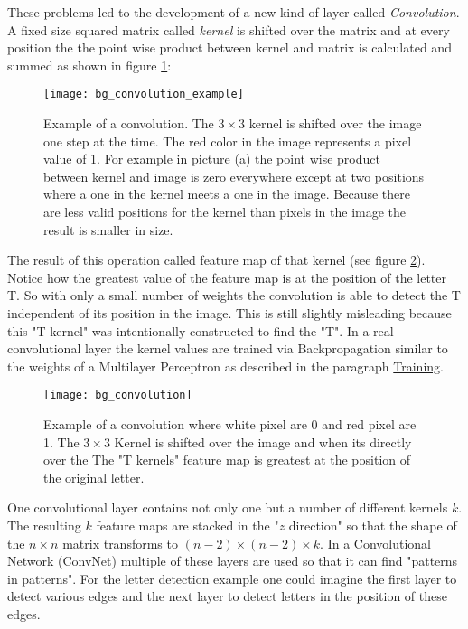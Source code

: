These problems led to the development of a new kind of layer called \textit{Convolution}. A fixed size squared matrix called \textit{kernel} is shifted over the matrix and at every position the the point wise product between kernel and matrix is calculated and summed as shown in figure \ref{fig:bg:conv_examp}:

\begin{figure}[H]
    \centering
    \texttt{[image: bg\_convolution\_example]}
    \caption{Example of a convolution. The $3 \times 3$ kernel is shifted over the image one step at the time. The red color in the image represents a pixel value of 1. For example in picture (a) the point wise product between kernel and image is zero everywhere except at two positions where a one in the kernel meets a one in the image. Because there are less valid positions for the kernel than pixels in the image the result is smaller in size.}
    \label{fig:bg:conv_examp}
\end{figure}


 The result of this operation called feature map of that kernel (see figure \ref{fig:bg:convolution}). Notice how the greatest value of the feature map is at the position of the letter T. So with only a small number of weights the convolution is able to detect the T independent of its position in the image.
 This is still slightly misleading because this "T kernel" was intentionally constructed to find the "T". In a real convolutional layer the kernel values are trained via Backpropagation similar to the weights of a Multilayer Perceptron as described in the paragraph \hyperref[par:training]{Training}.

\begin{figure}[H]
    \centering
    \texttt{[image: bg\_convolution]}
    \caption{Example of a convolution where white pixel are 0 and red pixel are 1. The $3 \times 3$ Kernel is shifted over the image and when its directly over the  The "T kernels" feature map is greatest at the position of the original letter. }
    \label{fig:bg:convolution}
\end{figure}

One convolutional layer contains not only one but a number of different kernels $k$. The resulting $k$ feature maps are stacked in the "$z$ direction" so that the shape of the $n \times n$ matrix transforms to $(n-2) \times (n-2) \times k$. In a Convolutional Network (ConvNet) multiple of these layers are used so that it can find "patterns in patterns". For the letter detection example one could imagine the first layer to detect various edges and the next layer to detect letters in the position of these edges.

